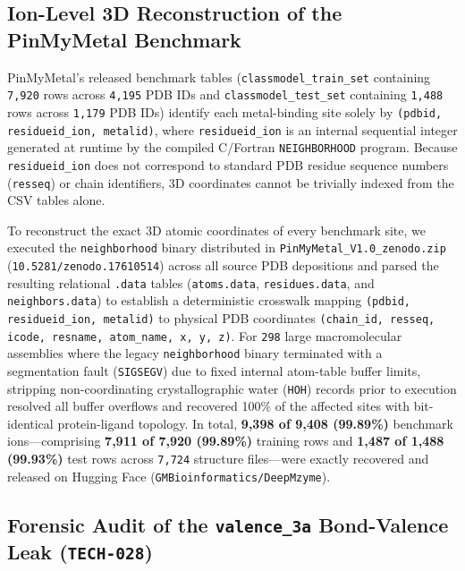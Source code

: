 \documentclass[10pt,a4paper,twocolumn]{article}
\begin{document}
\subsection{Ion-Level 3D Reconstruction of the PinMyMetal Benchmark}

PinMyMetal's released benchmark tables (\texttt{classmodel\_train\_set} containing \texttt{7,920} rows across \texttt{4,195} PDB IDs and \texttt{classmodel\_test\_set} containing \texttt{1,488} rows across \texttt{1,179} PDB IDs) identify each metal-binding site solely by \texttt{(pdbid, residueid\_ion, metalid)}, where \texttt{residueid\_ion} is an internal sequential integer generated at runtime by the compiled C/Fortran \texttt{NEIGHBORHOOD} program. Because \texttt{residueid\_ion} does not correspond to standard PDB residue sequence numbers (\texttt{resseq}) or chain identifiers, 3D coordinates cannot be trivially indexed from the CSV tables alone.

To reconstruct the exact 3D atomic coordinates of every benchmark site, we executed the \texttt{neighborhood} binary distributed in \texttt{PinMyMetal\_V1.0\_zenodo.zip} (\texttt{10.5281/zenodo.17610514}) across all source PDB depositions and parsed the resulting relational \texttt{.data} tables (\texttt{atoms.data}, \texttt{residues.data}, and \texttt{neighbors.data}) to establish a deterministic crosswalk mapping \texttt{(pdbid, residueid\_ion, metalid)} to physical PDB coordinates \texttt{(chain\_id, resseq, icode, resname, atom\_name, x, y, z)}. For \texttt{298} large macromolecular assemblies where the legacy \texttt{neighborhood} binary terminated with a segmentation fault (\texttt{SIGSEGV}) due to fixed internal atom-table buffer limits, stripping non-coordinating crystallographic water (\texttt{HOH}) records prior to execution resolved all buffer overflows and recovered 100\% of the affected sites with bit-identical protein-ligand topology. In total, \textbf{9,398 of 9,408 (99.89\%)} benchmark ions---comprising \textbf{7,911 of 7,920 (99.89\%)} training rows and \textbf{1,487 of 1,488 (99.93\%)} test rows across \texttt{7,724} structure files---were exactly recovered and released on Hugging Face (\texttt{GMBioinformatics/DeepMzyme}).

\subsection{Forensic Audit of the \texttt{valence\_3a} Bond-Valence Leak (\texttt{TECH-028})}
\end{document}
